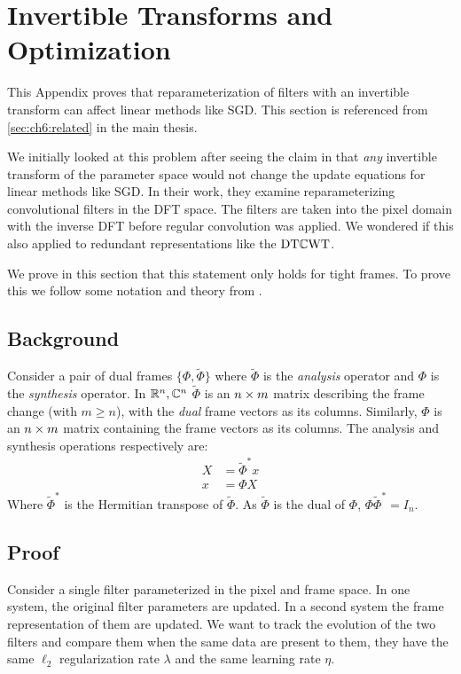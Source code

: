 \chapter{Invertible Transforms and Optimization} \label{appC:invertible}
\def \path {freqlearn/}
\def \imgpath {freqlearn/images}

This Appendix proves that reparameterization of filters with an invertible
transform can affect linear methods like SGD. This section is referenced from 
\autoref{sec:ch6:related} in the main thesis.

We initially looked at this problem after seeing the claim in
\cite{rippel_spectral_2015} that \emph{any} invertible transform of the parameter
space would not change the update equations for linear methods like SGD. In
their work, they examine reparameterizing convolutional filters in the DFT
space. The filters are taken into the pixel domain with the inverse DFT before
regular convolution was applied. We wondered if this also applied to redundant
representations like the $\DTCWT$.

We prove in this section that this statement only holds for tight frames.
To prove this we follow some notation and theory from 
\cite{kovacevic_introduction_2008}.

\section{Background}
Consider a pair of dual frames $\{\Phi, \tilde{\Phi}\}$ where $\tilde{\Phi}$ is
the \emph{analysis} operator and $\Phi$ is the \emph{synthesis} operator. 
In $\reals[n], \complexes[n]$ $\tilde{\Phi}$ is an $n\x m$ matrix describing the
frame change (with $m \geq n$), with the \emph{dual} frame vectors as its columns.
Similarly, $\Phi$ is an $n\x m$ matrix containing the frame vectors as its
columns. The analysis and synthesis operations respectively are:
\begin{align}
  X &= \tilde{\Phi}^* x \label{eq:appC:analysis}\\
  x &= \Phi X \label{eq:appC:synthesis}
\end{align}
Where $\tilde{\Phi}^*$ is the Hermitian transpose of $\tilde{\Phi}$. As
$\tilde{\Phi}$ is the dual of $\Phi$, $\Phi \tilde{\Phi}^* = I_n$.

\section{Proof}
Consider a single filter parameterized in the pixel and frame space. In one
system, the original filter parameters are updated. In a second system the
frame representation of them are updated. We want to track the evolution of the
two filters and compare them when the same data are present to them, they have
the same $\ell_2$ regularization rate $\lambda$ and the same learning rate $\eta$.


